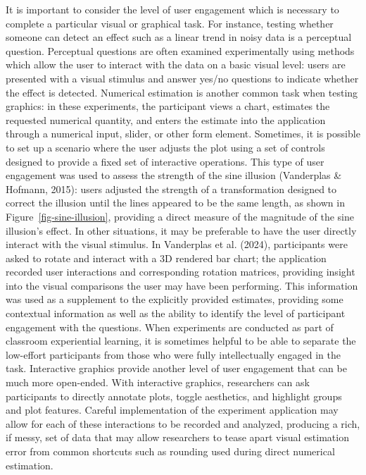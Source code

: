 \documentclass[
  10pt,
]{article}
\begin{document}
It is important to consider the level of user engagement which is
necessary to complete a particular visual or graphical task. For
instance, testing whether someone can detect an effect such as a linear
trend in noisy data is a perceptual question. Perceptual questions are
often examined experimentally using methods which allow the user to
interact with the data on a basic visual level: users are presented with
a visual stimulus and answer yes/no questions to indicate whether the
effect is detected. Numerical estimation is another common task when
testing graphics: in these experiments, the participant views a chart,
estimates the requested numerical quantity, and enters the estimate into
the application through a numerical input, slider, or other form
element. Sometimes, it is possible to set up a scenario where the user
adjusts the plot using a set of controls designed to provide a fixed set
of interactive operations. This type of user engagement was used to
assess the strength of the sine illusion (Vanderplas \& Hofmann, 2015):
users adjusted the strength of a transformation designed to correct the
illusion until the lines appeared to be the same length, as shown in
Figure~\ref{fig-sine-illusion}, providing a direct measure of the
magnitude of the sine illusion's effect. In other situations, it may be
preferable to have the user directly interact with the visual stimulus.
In Vanderplas et al. (2024), participants were asked to rotate and
interact with a 3D rendered bar chart; the application recorded user
interactions and corresponding rotation matrices, providing insight into
the visual comparisons the user may have been performing. This
information was used as a supplement to the explicitly provided
estimates, providing some contextual information as well as the ability
to identify the level of participant engagement with the questions. When
experiments are conducted as part of classroom experiential learning, it
is sometimes helpful to be able to separate the low-effort participants
from those who were fully intellectually engaged in the task.
Interactive graphics provide another level of user engagement that can
be much more open-ended. With interactive graphics, researchers can ask
participants to directly annotate plots, toggle aesthetics, and
highlight groups and plot features. Careful implementation of the
experiment application may allow for each of these interactions to be
recorded and analyzed, producing a rich, if messy, set of data that may
allow researchers to tease apart visual estimation error from common
shortcuts such as rounding used during direct numerical estimation.
\end{document}

